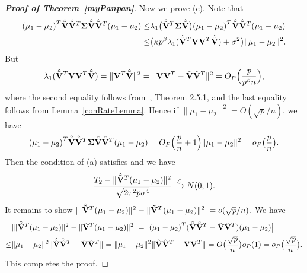 \documentclass[3p]{elsarticle}
\theoremstyle{plain}
\theoremstyle{definition}
\theoremstyle{remark}
\begin{document}
\begin{appendices}
\begin{proof}[\textbf{Proof of Theorem~\ref{myPanpan}}]
Now we prove (c).
    Note that
    \begin{equation*}
        \begin{aligned}
             {(\mu_1-\mu_2)}^T \hat{\tilde{\mathbf{V}}}\hat{\tilde{\mathbf{V}}}^T\boldsymbol{\Sigma} \hat{\tilde{\mathbf{V}}}\hat{\tilde{\mathbf{V}}}^T(\mu_1-\mu_2)
            \leq &
             \lambda_1\big(\hat{\tilde{\mathbf{V}}}^T\boldsymbol{\Sigma} \hat{\tilde{\mathbf{V}}}\big) {(\mu_1-\mu_2)}^T \hat{\tilde{\mathbf{V}}}\hat{\tilde{\mathbf{V}}}^T(\mu_1-\mu_2)\\
            \leq & 
             \big(\kappa p^{\beta}\lambda_1(\hat{\tilde{\mathbf{V}}}^T \mathbf{V}\mathbf{V}^T  \hat{\tilde{\mathbf{V}}})+\sigma^2\big)
             \|\mu_1-\mu_2\|^2.
        \end{aligned}
    \end{equation*}
    But
    \begin{equation*}
        \begin{aligned}
\lambda_1(\hat{\tilde{\mathbf{V}}}^T \mathbf{V}\mathbf{V}^T  \hat{\tilde{\mathbf{V}}})
=\|\mathbf{V}^T  \hat{\tilde{\mathbf{V}}}\|^2
            = \|\mathbf{V}\mathbf{V}^T-\hat{\mathbf{V}}\hat{\mathbf{V}}^T\|^2=O_P\Big(\frac{p}{p^{\beta}n}\Big),
        \end{aligned}
    \end{equation*}
    where the second equality follows from~\cite{matrixComputations}, Theorem 2.5.1, and the last equality follows from Lemma~\ref{conRateLemma}. 
Hence if $\|\mu_1-\mu_2\|^2=O(\sqrt{p}/n)$, we have
$$
             {(\mu_1-\mu_2)}^T \hat{\tilde{\mathbf{V}}}\hat{\tilde{\mathbf{V}}}^T\boldsymbol{\Sigma} \hat{\tilde{\mathbf{V}}}\hat{\tilde{\mathbf{V}}}^T(\mu_1-\mu_2)=O_P\Big(\frac{p}{n}+1\Big)\|\mu_1-\mu_2\|^2=o_P\big(\frac{p}{n}\big).
$$
Then the condition of (a) satisfies and we have
$$
\frac{T_2-\|\hat{\tilde{\mathbf{V}}}^T (\mu_1-\mu_2)\|^2}{\sqrt{2\tau^2 p \sigma^4}}
\xrightarrow{\mathcal{L}}N(0,1).
$$
It remains to show
$
|\|\hat{\tilde{\mathbf{V}}}^T (\mu_1-\mu_2)\|^2
-\|\tilde{\mathbf{V}}^T (\mu_1-\mu_2)\|^2|
=o(\sqrt{p}/n)
$.
    We have
    \begin{equation*}
        \begin{aligned}
            &|\|\hat{\tilde{\mathbf{V}}}^T (\mu_1-\mu_2)\|^2-\|\tilde{\mathbf{V}}^T (\mu_1-\mu_2)\|^2|=
            \big|{(\mu_1-\mu_2)}^T(\hat{\tilde{\mathbf{V}}}\hat{\tilde{\mathbf{V}}}^T-\tilde{\mathbf{V}}\tilde{\mathbf{V}}^T)(\mu_1-\mu_2)\big|\\
            \leq &
            \|\mu_1-\mu_2\|^2 \|\hat{\tilde{\mathbf{V}}}\hat{\tilde{\mathbf{V}}}^T-\tilde{\mathbf{V}}\tilde{\mathbf{V}}^T\|
            = 
            \|\mu_1-\mu_2\|^2  \|\hat{\mathbf{V}}\hat{\mathbf{V}}^T-\mathbf{V}\mathbf{V}^T\|
            =O\big(\frac{\sqrt{p}}{n}\big)o_P(1)=o_P\big(\frac{\sqrt{p}}{n}\big).
        \end{aligned}
    \end{equation*}
This completes the proof.
\end{proof}


\end{appendices}
\end{document}

